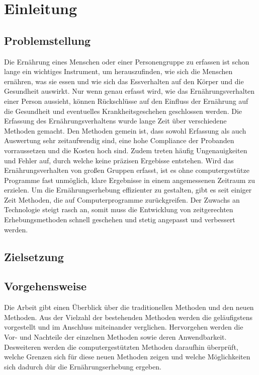 
\section{Einleitung}

\subsection{Problemstellung}
Die Ernährung eines Menschen oder einer Personengruppe zu erfassen ist schon lange ein wichtiges Instrument, um herauszufinden, wie sich die Menschen ernähren, was sie essen und wie sich das Essverhalten auf den Körper und die Gesundheit auswirkt. Nur wenn genau erfasst wird, wie das Ernährungsverhalten einer Person aussieht, können Rückschlüsse auf den Einfluss der Ernährung auf die Gesundheit und eventuelles Krankheitsgeschehen geschlossen werden. 
Die Erfassung des Ernährungsverhaltens wurde lange Zeit über verschiedene Methoden gemacht. Den Methoden gemein ist, dass sowohl Erfassung als auch Auswertung sehr zeitaufwendig sind, eine hohe Compliance der Probanden vorraussetzen und die Kosten hoch sind. Zudem treten häufig Ungenauigkeiten und Fehler auf, durch welche keine präzisen Ergebisse entstehen. 
Wird das Ernährungsverhalten von großen Gruppen erfasst, ist es ohne computergestütze Programme fast unmöglich, klare Ergebnisse in einem angemessenen Zeitraum zu erzielen. 
Um die Ernährungserhebung effizienter zu gestalten, gibt es seit einiger Zeit Methoden, die auf Computerprogramme zurückgreifen. Der Zuwachs an Technologie steigt rasch an, somit muss die Entwicklung von zeitgerechten Erhebungsmethoden schnell geschehen und stetig angepasst und verbessert werden. 

\subsection{Zielsetzung}

\subsection{Vorgehensweise}
Die Arbeit gibt einen Überblick über die traditionellen Methoden und den neuen Methoden. Aus der Vielzahl der bestehenden Methoden werden die geläufigstens vorgestellt und im Anschluss miteinander verglichen. Hervorgehen werden die Vor- und Nachteile der einzelnen Methoden sowie deren Anwendbarkeit. Desweiteren werden die computergestützten 
Methoden daraufhin überprüft, welche Grenzen sich für diese neuen Methoden zeigen und welche 	Möglichkeiten sich dadurch dür die Ernährungserhebung ergeben. 